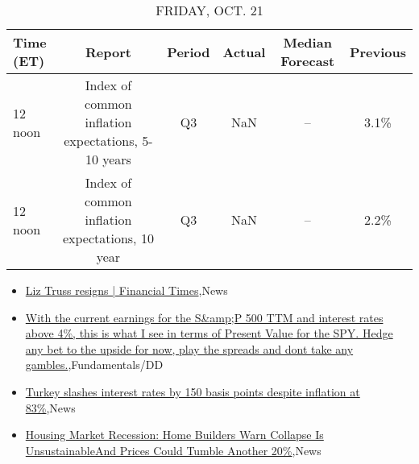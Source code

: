 \documentclass{article}%
\begin{document}
%


\begin{table}[htbp]%
\caption{FRIDAY, OCT. 21}%
\centering%
\begin{adjustbox}{width=1\textwidth}%
\begin{tabular}{lccccc}
\toprule
Time (ET) &                                             Report & Period & Actual & Median Forecast & Previous \\
\midrule
  12 noon & Index of common inflation expectations, 5-10 years &     Q3 &    NaN &              -- &     3.1\% \\
  12 noon &    Index of common inflation expectations, 10 year &     Q3 &    NaN &              -- &     2.2\% \\
\bottomrule
\end{tabular}
%
\end{adjustbox}%
\end{table}

%
\begin{itemize}%
\item%
\href{https://reddit.com/r/wallstreetbets/comments/y8x5l4/liz\_truss\_resigns\_financial\_times/}{Liz Truss resigns | Financial Times},News%
\item%
\href{https://reddit.com/r/StockMarket/comments/y8ukes/with\_the\_current\_earnings\_for\_the\_sp\_500\_ttm\_and/}{With the current earnings for the S\&amp;P 500 TTM and interest rates above 4\%, this is what I see in terms of Present Value for the SPY. Hedge any bet to the upside for now, play the spreads and dont take any gambles.},Fundamentals/DD%
\item%
\href{https://reddit.com/r/Economics/comments/y8ves5/turkey\_slashes\_interest\_rates\_by\_150\_basis\_points/}{Turkey slashes interest rates by 150 basis points despite inflation at 83\%},News%
\item%
\href{https://reddit.com/r/Economics/comments/y8unv6/housing\_market\_recession\_home\_builders\_warn/}{Housing Market Recession: Home Builders Warn Collapse Is UnsustainableAnd Prices Could Tumble Another 20\%},News%
\end{itemize}%
\end{document}
